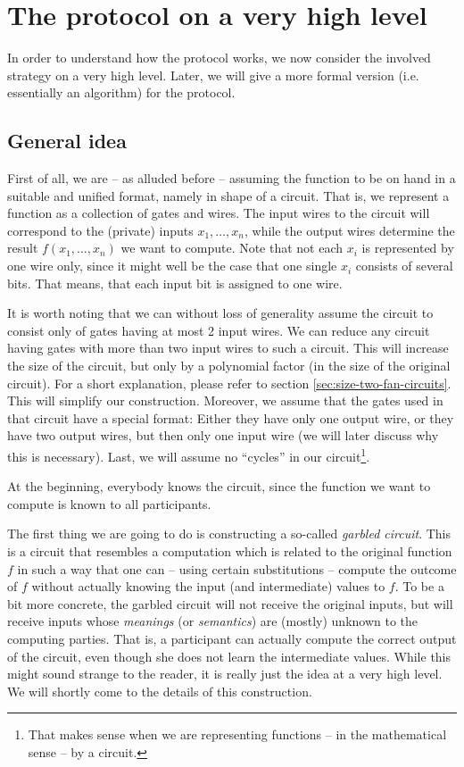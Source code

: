 \section{The protocol on a very high level}
\label{sec:high-level-description}

In order to understand how the protocol works, we now consider the involved strategy on a very high level. Later, we will give a more formal version (i.e. essentially an algorithm) for the protocol.

\subsection{General idea}
\label{sec:general-idea}

First of all, we are -- as alluded before -- assuming the function to be on hand in a suitable and unified format, namely in shape of a circuit. That is, we represent a function as a collection of gates and wires. The input wires to the circuit will correspond to the (private) inputs $x_1,\dots,x_n$, while the output wires determine the result $f(x_1,\dots,x_n)$ we want to compute. Note that not each $x_i$ is represented by one wire only, since it might well be the case that one single $x_i$ consists of several bits. That means, that each input bit is assigned to one wire.

It is worth noting that we can without loss of generality assume the circuit to consist only of gates having at most 2 input wires. We can reduce any circuit having gates with more than two input wires to such a circuit. This will increase the size of the circuit, but only by a polynomial factor (in the size of the original circuit). For a short explanation, please refer to section \ref{sec:size-two-fan-circuits}. This will simplify our construction. Moreover, we assume that the gates used in that circuit have a special format: Either they have only one output wire, or they have two output wires, but then only one input wire (we will later discuss why this is necessary). Last, we will assume no ``cycles'' in our circuit\footnote{That makes sense when we are representing functions -- in the mathematical sense -- by a circuit.}.

At the beginning, everybody knows the circuit, since the function we want to compute is known to all participants.

The first thing we are going to do is constructing a so-called \emph{garbled circuit}. This is a circuit that resembles a computation which is related to the original function $f$ in such a way that one can -- using certain substitutions -- compute the outcome of $f$ without actually knowing the input (and intermediate) values to $f$. To be a bit more concrete, the garbled circuit will not receive the original inputs, but will receive inputs whose \emph{meanings} (or \emph{semantics}) are (mostly) unknown to the computing parties. That is, a participant can actually compute the correct output of the circuit, even though she does not learn the intermediate values. While this might sound strange to the reader, it is really just the idea at a very high level. We will shortly come to the details of this construction.

